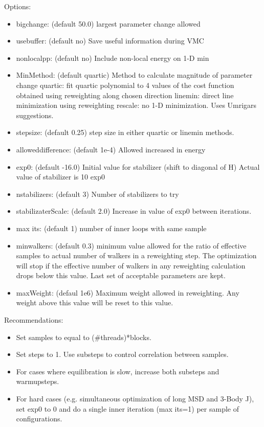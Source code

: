 Options:
\begin{itemize}
  \item{bigchange: (default 50.0) largest parameter change allowed}
  \item{usebuffer: (default no) Save useful information during VMC}
  \item{nonlocalpp: (default no) Include non-local energy on 1-D min}
  \item{MinMethod: (default quartic) Method to calculate magnitude of parameter change
quartic: fit quartic polynomial to 4 values of the cost function obtained using reweighting 
along chosen direction linemin: direct line minimization using reweighting rescale:
no 1-D minimization. Uses Umrigars suggestions.}
  \item{stepsize: (default 0.25) step size in either quartic or linemin methods.}
  \item{alloweddifference: (default 1e-4) Allowed increased in energy}
  \item{exp0: (default -16.0) Initial value for stabilizer (shift to diagonal of H) Actual value
of stabilizer is 10 exp0}
  \item{nstabilizers: (default 3) Number of stabilizers to try}
  \item{stabilizaterScale: (default 2.0) Increase in value of exp0 between iterations.}
  \item{max its: (default 1) number of inner loops with same sample}
  \item{minwalkers: (default 0.3) minimum value allowed for the ratio of effective samples
to actual number of walkers in a reweighting step. The optimization will stop if the
effective number of walkers in any reweighting calculation drops below this value. Last
set of acceptable parameters are kept.}
  \item{maxWeight: (defaul 1e6) Maximum weight allowed in reweighting. Any weight above
this value will be reset to this value.}
\end{itemize}

Recommendations:
\begin{itemize}
  \item{Set samples to equal to (\#threads)*blocks.}
  \item{Set steps to 1. Use substeps to control correlation between samples.}
  \item{For cases where equilibration is slow, increase both substeps and warmupsteps.}
  \item{For hard cases (e.g. simultaneous optimization of long MSD and 3-Body J), set exp0
to 0 and do a single inner iteration (max its=1) per sample of configurations.}
\end{itemize}


